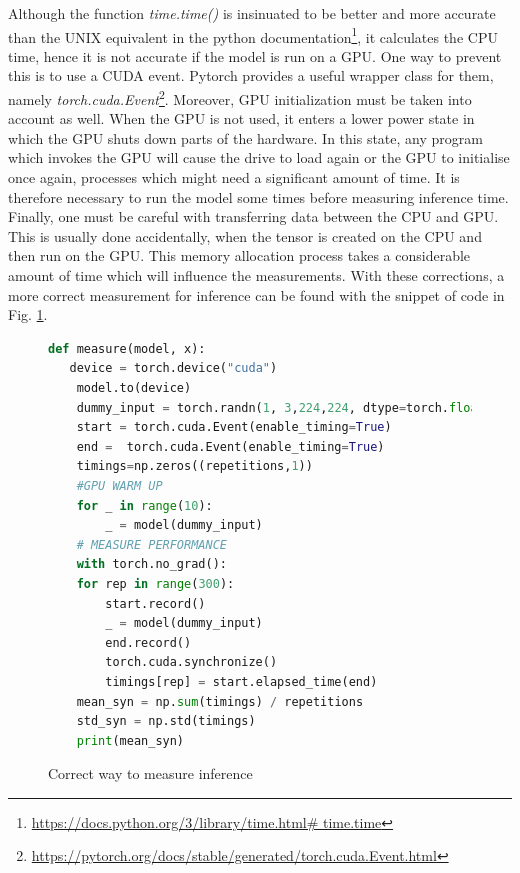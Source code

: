 Although the function \textit{time.time()} is insinuated to be better and more accurate than the UNIX equivalent in the python documentation\footnote{ \url{https://docs.python.org/3/library/time.html\# time.time} }, it calculates the CPU time, hence it is not accurate if the model is run on a GPU. One way to prevent this is to use a CUDA event. Pytorch provides a useful wrapper class for them, namely \textit{torch.cuda.Event}\footnote{ \url{https://pytorch.org/docs/stable/generated/torch.cuda.Event.html} }. Moreover, GPU initialization must be taken into account as well. When the GPU is not used, it enters a lower power state in which the GPU shuts down parts of the hardware. In this state, any program which invokes the GPU will cause the drive to load again or the GPU to initialise once again, processes which might need a significant amount of time. It is therefore necessary to run the model some times before measuring inference time. \cite{Correct_inference_measure}
Finally, one must be careful with transferring data between the CPU and GPU. This is usually done accidentally, when the tensor is created on the CPU and then run on the GPU. This memory allocation process takes a considerable amount of time which will influence the measurements. \cite{Correct_inference_measure}
With these corrections, a more correct measurement for inference can be found with the snippet of code in Fig. \ref{fig:corr_inf}.\\
\begin{figure}[h]
\begin{lstlisting}[language=python]
def measure(model, x):
   device = torch.device("cuda")
    model.to(device)
    dummy_input = torch.randn(1, 3,224,224, dtype=torch.float).to(device)
    start = torch.cuda.Event(enable_timing=True)
    end =  torch.cuda.Event(enable_timing=True)
    timings=np.zeros((repetitions,1))
    #GPU WARM UP
    for _ in range(10):
        _ = model(dummy_input)
    # MEASURE PERFORMANCE
    with torch.no_grad():
    for rep in range(300):
        start.record()
        _ = model(dummy_input)
        end.record()
        torch.cuda.synchronize()
        timings[rep] = start.elapsed_time(end)
    mean_syn = np.sum(timings) / repetitions
    std_syn = np.std(timings)
    print(mean_syn)

\end{lstlisting}
\caption{Correct way to measure inference}
\label{fig:corr_inf}
\end{figure}

